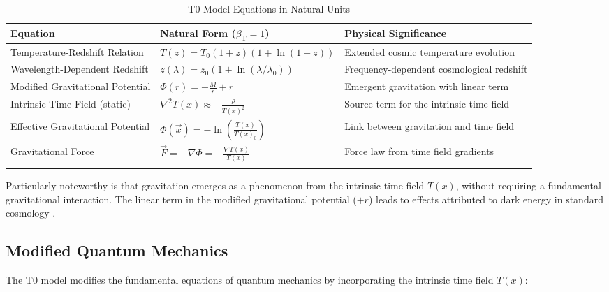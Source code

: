 \documentclass[12pt,a4paper]{article}
\newcommand{\Tfield}{T(x)}
\newcommand{\betaT}{\beta_{\text{T}}}
\begin{document}
	\begin{table}[ht]
		\centering
		\begin{adjustbox}{scale=0.70}
			\begin{tabular}{lll}
				\hline
				\textbf{Equation} & \textbf{Natural Form ($\betaT = 1$)} & \textbf{Physical Significance} \\
				\hline
				Temperature-Redshift Relation & $T(z) = T_0(1+z)(1+\ln(1+z))$ & Extended cosmic temperature evolution \\
				Wavelength-Dependent Redshift & $z(\lambda) = z_0(1+\ln(\lambda/\lambda_0))$ & Frequency-dependent cosmological redshift \\
				Modified Gravitational Potential & $\Phi(r) = -\frac{M}{r} + r$ & Emergent gravitation with linear term \\
				Intrinsic Time Field (static) & $\nabla^2\Tfield \approx -\frac{\rho}{\Tfield^2}$ & Source term for the intrinsic time field \\
				Effective Gravitational Potential & $\Phi(\vec{x}) = -\ln\left(\frac{\Tfield}{\Tfield_0}\right)$ & Link between gravitation and time field \\
				Gravitational Force & $\vec{F} = -\nabla
				
				\Phi = -\frac{\nabla\Tfield}{\Tfield}$ & Force law from time field gradients \\
				\hline
				\multicolumn{2}{c}{} \\
				\hline
			\end{tabular}
		\end{adjustbox}
		\caption{T0 Model Equations in Natural Units}
		\label{tab:t0_equations}
	\end{table}
	
	Particularly noteworthy is that gravitation emerges as a phenomenon from the intrinsic time field $\Tfield$, without requiring a fundamental gravitational interaction. The linear term in the modified gravitational potential ($+r$) leads to effects attributed to dark energy in standard cosmology \cite{pascher_emergente_2025}.
	
	\subsection{Modified Quantum Mechanics}
	
	The T0 model modifies the fundamental equations of quantum mechanics by incorporating the intrinsic time field $\Tfield$:
	
\end{document}
